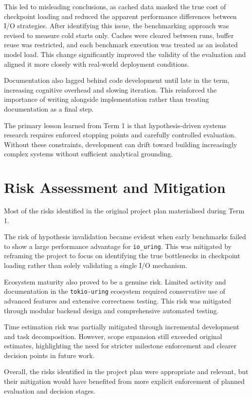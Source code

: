 \documentclass{article}
\begin{document}
This led to misleading conclusions, as cached data masked the true cost of checkpoint loading and reduced the apparent performance differences between I/O strategies. After identifying this issue, the benchmarking approach was revised to measure cold starts only. Caches were cleared between runs, buffer reuse was restricted, and each benchmark execution was treated as an isolated model load. This change significantly improved the validity of the evaluation and aligned it more closely with real-world deployment conditions.

Documentation also lagged behind code development until late in the term, increasing cognitive overhead and slowing iteration. This reinforced the importance of writing alongside implementation rather than treating documentation as a final step.

The primary lesson learned from Term 1 is that hypothesis-driven systems research requires enforced stopping points and carefully controlled evaluation. Without these constraints, development can drift toward building increasingly complex systems without sufficient analytical grounding.

\section{Risk Assessment and Mitigation}

Most of the risks identified in the original project plan materialised during Term 1.

The risk of hypothesis invalidation became evident when early benchmarks failed to show a large performance advantage for \texttt{io\_uring}. This was mitigated by reframing the project to focus on identifying the true bottlenecks in checkpoint loading rather than solely validating a single I/O mechanism.

Ecosystem maturity also proved to be a genuine risk. Limited activity and documentation in the \texttt{tokio-uring} ecosystem required conservative use of advanced features and extensive correctness testing. This risk was mitigated through modular backend design and comprehensive automated testing.

Time estimation risk was partially mitigated through incremental development and task decomposition. However, scope expansion still exceeded original estimates, highlighting the need for stricter milestone enforcement and clearer decision points in future work.

Overall, the risks identified in the project plan were appropriate and relevant, but their mitigation would have benefited from more explicit enforcement of planned evaluation and decision stages.
\end{document}
